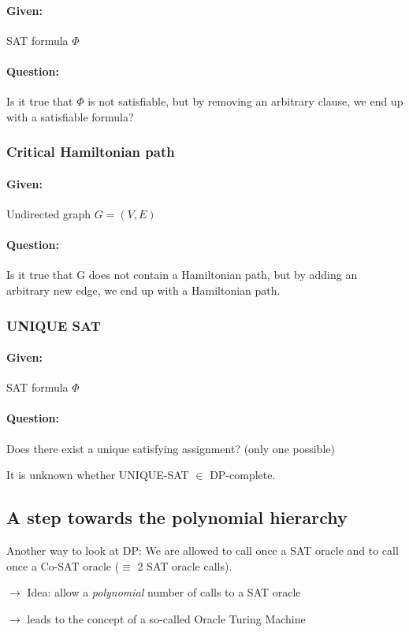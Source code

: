 \documentclass[11pt]{article}
\theoremstyle{definition}
\theoremstyle{definition}
\begin{document}
\paragraph{Given:} SAT formula $ \Phi $
\paragraph{Question:} Is it true that $ \Phi $ is not satisfiable, but by removing an arbitrary clause, we end up with a satisfiable formula?

\subsubsection{Critical Hamiltonian path}
\paragraph{Given:} Undirected graph $ G = (V, E) $
\paragraph{Question:} Is it true that G does not contain a Hamiltonian path, but by adding an arbitrary new edge, we end up with a Hamiltonian path.

\subsubsection{UNIQUE SAT}
\paragraph{Given:} SAT formula $ \Phi $
\paragraph{Question:} Does there exist a unique satisfying assignment? (only one possible)

It is unknown whether UNIQUE-SAT $ \in $ DP-complete.

\subsection{A step towards the polynomial hierarchy}
Another way to look at DP: We are allowed to call once a SAT oracle and to call once a Co-SAT oracle ($ \equiv $ 2 SAT oracle calls).

$ \rightarrow $ Idea: allow a \textit{polynomial} number of calls to a SAT oracle

$ \rightarrow $ leads to the concept of a so-called Oracle Turing Machine
\end{document}
